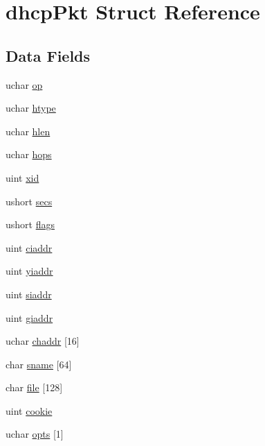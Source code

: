 \hypertarget{structdhcpPkt}{\section{dhcp\-Pkt Struct Reference}
\label{structdhcpPkt}
}
\subsection*{Data Fields}
\begin{DoxyCompactItemize}
\item 
uchar \hyperlink{structdhcpPkt_a6240894b73b2216f6390e867274dfc9c}{op}
\item 
uchar \hyperlink{structdhcpPkt_ac24a7e3d31318851bc5d84e675148d08}{htype}
\item 
uchar \hyperlink{structdhcpPkt_a08914a4ec7eb2b42b49c58846241c651}{hlen}
\item 
uchar \hyperlink{structdhcpPkt_ab23d57fb3a3cd50f1a98a74640be536f}{hops}
\item 
uint \hyperlink{structdhcpPkt_a07f00255478787b96a0cab3fcd8bedc0}{xid}
\item 
ushort \hyperlink{structdhcpPkt_a7475ebcc0c47265ecde655e323373912}{secs}
\item 
ushort \hyperlink{structdhcpPkt_a5277e2cefb888b35e414f113c045112e}{flags}
\item 
uint \hyperlink{structdhcpPkt_ad9d4c8cb18c57e8b59b929325024b170}{ciaddr}
\item 
uint \hyperlink{structdhcpPkt_a8c4bd15e865dad84840058a7fb94c12d}{yiaddr}
\item 
uint \hyperlink{structdhcpPkt_a9491030b52f03e8a652e81122619d62c}{siaddr}
\item 
uint \hyperlink{structdhcpPkt_a956d85f55011edee0aef50875bba0fea}{giaddr}
\item 
uchar \hyperlink{structdhcpPkt_a1d2bb27b495c49626b834f9bdea85ead}{chaddr} \mbox{[}16\mbox{]}
\item 
char \hyperlink{structdhcpPkt_a9d689ffd1a62795bc7e2c9f8d307711c}{sname} \mbox{[}64\mbox{]}
\item 
char \hyperlink{structdhcpPkt_a08a75af14420f1815ebddb7cb7dafb7c}{file} \mbox{[}128\mbox{]}
\item 
uint \hyperlink{structdhcpPkt_adee276232c86a6e9e7a2f815236d0648}{cookie}
\item 
uchar \hyperlink{structdhcpPkt_a5e3c645306d2df469b9eda0dec731bbf}{opts} \mbox{[}1\mbox{]}
\end{DoxyCompactItemize}


